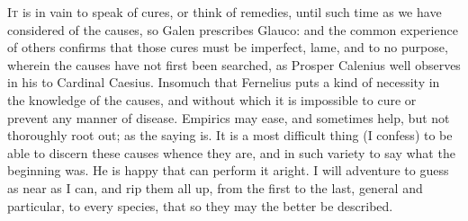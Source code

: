 {{\lettrine{I}{t} is in vain to speak of cures, or think of remedies, until such time
as we have considered of the causes, so Galen prescribes Glauco:
and the common experience of others confirms that those cures must be
imperfect, lame, and to no purpose, wherein the causes have not first
been searched, as Prosper Calenius well observes in his  to Cardinal Caesius. Insomuch that Fernelius puts a
kind of necessity in the knowledge of the causes, and without which it
is impossible to cure or prevent any manner of disease. Empirics may
ease, and sometimes help, but not thoroughly root out;  as the saying is. It is a most difficult thing (I confess) to be
able to discern these causes whence they are, and in such variety
to say what the beginning was. He is happy that can perform it
aright. I will adventure to guess as near as I can, and rip them all
up, from the first to the last, general and particular, to every
species, that so they may the better be described.

}}
